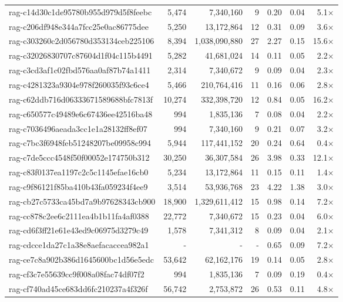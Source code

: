 \begin{table}[h!]
\begin{tabular}{lrrrrrr}
rag-c14d30c1de95780b955d979d5f8feebc & 5,474 & 7,340,160 & 9 & 0.20 & 0.04 & 5.1$\times$ \\
rag-c206df948e344a7fcc25e0ac86775dee & 5,250 & 13,172,864 & 12 & 0.31 & 0.09 & 3.6$\times$ \\
rag-c303260c2d056780d353134ceb225106 & 8,394 & 1,038,090,880 & 27 & 2.27 & 0.15 & 15.6$\times$ \\
rag-c32026830707c87604d1f04c115b4491 & 5,282 & 41,681,024 & 14 & 0.11 & 0.05 & 2.2$\times$ \\
rag-c3cd3af1c02fbd576aa0af87b74a1411 & 2,314 & 7,340,672 & 9 & 0.09 & 0.04 & 2.3$\times$ \\
rag-c4281323a9304e978f260035f93c6ce4 & 5,466 & 210,764,416 & 11 & 0.16 & 0.06 & 2.8$\times$ \\
rag-c62ddb716d06333671589688bfc7813f & 10,274 & 332,398,720 & 12 & 0.84 & 0.05 & 16.2$\times$ \\
rag-c650577c49489e6c67436ee42516ba48 & 994 & 1,835,136 & 7 & 0.08 & 0.04 & 2.2$\times$ \\
rag-c7036496aeada3cc1e1a28132ff8ef07 & 994 & 7,340,160 & 9 & 0.21 & 0.07 & 3.2$\times$ \\
rag-c7bc3f6948feb51248207be09958c994 & 5,944 & 117,441,152 & 20 & 0.24 & 0.64 & 0.4$\times$ \\
rag-c7de5ccc4548f50f00052e174750b312 & 30,250 & 36,307,584 & 26 & 3.98 & 0.33 & 12.1$\times$ \\
rag-c83f0137ea1197c2c5c1145efae16cb0 & 5,234 & 13,172,864 & 11 & 0.15 & 0.11 & 1.4$\times$ \\
rag-c9f86121f85ba410b43fa059234f4ee9 & 3,514 & 53,936,768 & 23 & 4.22 & 1.38 & 3.0$\times$ \\
rag-cb27c5733ca45bd7a9b97628343cb900 & 18,900 & 1,329,611,412 & 15 & 0.98 & 0.14 & 7.2$\times$ \\
rag-cc878c2ee6c2111ea4b1b11fa4af0388 & 22,772 & 7,340,672 & 15 & 0.23 & 0.04 & 6.0$\times$ \\
rag-cd6f3ff21e61e43ed9c06975d3279c49 & 1,578 & 7,341,312 & 8 & 0.09 & 0.04 & 2.1$\times$ \\
rag-cdcce1da27c1a38e8aefacaccea982a1 & - & - & - & 0.65 & 0.09 & 7.2$\times$ \\
rag-ce7c8a902b386d1645600bc1d56e5edc & 53,642 & 62,162,176 & 19 & 0.14 & 0.05 & 2.8$\times$ \\
rag-cf3c7e55639cc9f008a08fac74df07f2 & 994 & 1,835,136 & 7 & 0.09 & 0.19 & 0.4$\times$ \\
rag-cf740ad45ce683dd6fc210237a4f326f & 56,742 & 2,753,872 & 26 & 0.53 & 0.11 & 4.8$\times$ \\

\end{tabular}
\end{table}
